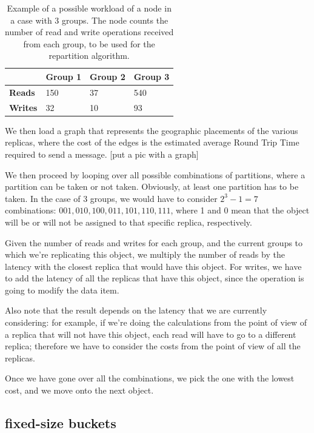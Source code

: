\begin{table}[htb]
  \centering
  \begin{tabular}{l l l l}
    \hline
    & \textbf{Group 1} & \textbf{Group 2} & \textbf{Group 3} \\
    \hline
    \textbf{Reads} & 150 & 37 & 540 \\
    \textbf{Writes} & 32 & 10 & 93 \\
    \hline
  \end{tabular}
  \caption{Example of a possible workload of a node in a case with 3 groups. The node counts the number of read and write operations received from each group, to be used for the repartition algorithm.}\label{tab:workload-example}
\end{table}

We then load a graph that represents the geographic placements of the various replicas, where the cost of the edges is the estimated average Round Trip Time required to send a message.
[put a pic with a graph]

We then proceed by looping over all possible combinations of partitions, where a partition can be taken or not taken. Obviously, at least one partition has to be taken. In the case of 3 groups, we would have to consider $2^3 -1 = 7$ combinations: $001, 010, 100, 011, 101, 110, 111$, where 1 and 0 mean that the object will be or will not be assigned to that specific replica, respectively.

Given the number of reads and writes for each group, and the current groups to which we're replicating this object, we multiply the number of reads by the latency with the closest replica that would have this object. For writes, we have to add the latency of all the replicas that have this object, since the operation is going to modify the data item.

Also note that the result depends on the latency that we are currently considering: for example, if we're doing the calculations from the point of view of a replica that will not have this object, each read will have to go to a different replica; therefore we have to consider the costs from the point of view of all the replicas.

Once we have gone over all the combinations, we pick the one with the lowest cost, and we move onto the next object.

\subsection{fixed-size buckets}\label{sec:fixed-size buckets}

